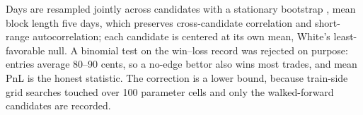 Days are resampled jointly across candidates with a stationary bootstrap
\citep{politisromano1994}, mean block length five days, which preserves
cross-candidate correlation and short-range autocorrelation; each candidate
is centered at its own mean, White's least-favorable null. A binomial test
on the win--loss record was rejected on purpose: entries average 80--90
cents, so a no-edge bettor also wins most trades, and mean PnL is the
honest statistic. The correction is a lower bound, because train-side grid
searches touched over 100 parameter cells and only the walked-forward
candidates are recorded.
